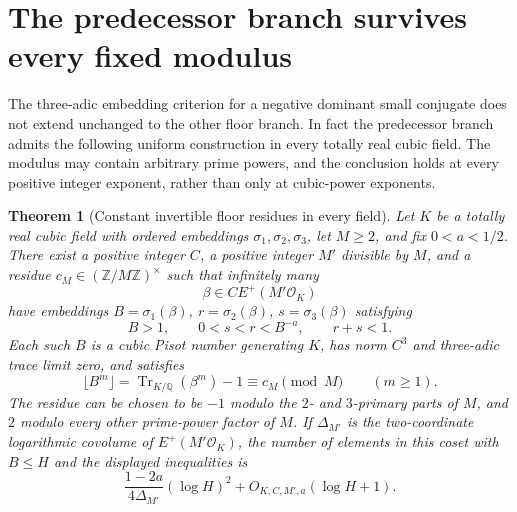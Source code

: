 \documentclass[11pt,a4paper]{article}
\newtheorem{theorem}{Theorem}[section]
\theoremstyle{definition}\newtheorem{definition}[theorem]{Definition}
\theoremstyle{remark}\newtheorem{remark}[theorem]{Remark}
\begin{document}
\section{The predecessor branch survives every fixed modulus}
\label{new:sec:predecessor}
The three-adic embedding criterion for a negative dominant small
conjugate does not extend unchanged to the other floor branch.  In
fact the predecessor branch admits the following uniform construction
in every totally real cubic field.  The modulus may contain arbitrary
prime powers, and the conclusion holds at every positive integer
exponent, rather than only at cubic-power exponents.

\begin{theorem}[Constant invertible floor residues in every field]
\label{new:thm:predecessor}
Let $K$ be a totally real cubic field with ordered embeddings
$\sigma_1,\sigma_2,\sigma_3$, let $M\ge2$, and fix $0<a<1/2$.
There exist a positive integer $C$, a positive integer $M'$ divisible
by $M$, and a residue $c_M\in(\mathbb Z/M\mathbb Z)^\times$
such that infinitely many
\[
 \beta\in C E^+(M'\mathcal O_K)
\]
have embeddings $B=\sigma_1(\beta)$, $r=\sigma_2(\beta)$,
$s=\sigma_3(\beta)$ satisfying
\[
 B>1,\qquad 0<s<r<B^{-a},\qquad r+s<1.
\]
Each such $B$ is a cubic Pisot number generating $K$, has norm $C^3$
and three-adic trace limit zero, and satisfies
\begin{equation}\label{new:eq:allpowers}
 \lfloor B^m\rfloor=\operatorname{Tr}_{K/\mathbb Q}(\beta^m)-1
       \equiv c_M\pmod M\qquad(m\ge1).
\end{equation}
The residue can be chosen to be $-1$ modulo the $2$- and $3$-primary
parts of $M$, and $2$ modulo every other prime-power factor of $M$.
If $\Delta_{M'}$ is the two-coordinate logarithmic covolume of
$E^+(M'\mathcal O_K)$, the number of elements in this coset with
$B\le H$ and the displayed inequalities is
\[
 \frac{1-2a}{4\Delta_{M'}}(\log H)^2+O_{K,C,M',a}(\log H+1).
\]
\end{theorem}
\end{document}
